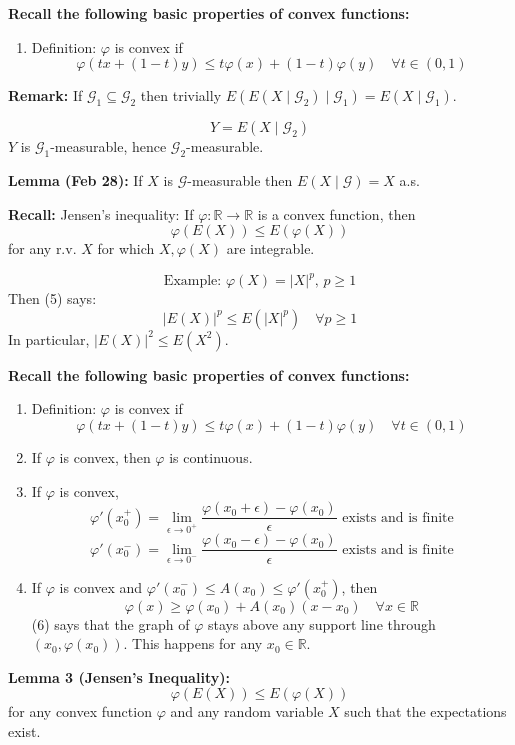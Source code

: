 \textbf{Recall the following basic properties of convex functions:}
\begin{enumerate}
    \item Definition: \(\varphi\) is convex if 
    \[
    \varphi(tx + (1-t)y) \leq t\varphi(x) + (1-t)\varphi(y) \quad \forall t \in (0, 1)
    \]
\end{enumerate}

\textbf{Remark:} If \(\mathcal{G}_1 \subseteq \mathcal{G}_2\) then trivially \( E(E(X \mid \mathcal{G}_2) \mid \mathcal{G}_1) = E(X \mid \mathcal{G}_1) \).

\[
Y = E(X \mid \mathcal{G}_2) 
\]
\( Y \) is \(\mathcal{G}_1\)-measurable, hence \(\mathcal{G}_2\)-measurable.

\textbf{Lemma (Feb 28):} If \(X\) is \(\mathcal{G}\)-measurable then \( E(X \mid \mathcal{G}) = X \) a.s.

\textbf{Recall:} Jensen's inequality: If \( \varphi : \mathbb{R} \rightarrow \mathbb{R} \) is a convex function, then
\[
\varphi(E(X)) \leq E(\varphi(X)) \tag{5}
\]
for any r.v. \(X\) for which \(X, \varphi(X)\) are integrable.

\[
\text{Example: } \varphi(X) = |X|^p, \, p \geq 1 
\]
Then (5) says:
\[
|E(X)|^p \leq E(|X|^p) \quad \forall p \geq 1 
\]
In particular, \( |E(X)|^2 \leq E(X^2) \).

\textbf{Recall the following basic properties of convex functions:}
\begin{enumerate}
    \item Definition: \(\varphi\) is convex if 
    \[
    \varphi(tx + (1-t)y) \leq t\varphi(x) + (1-t)\varphi(y) \quad \forall t \in (0, 1)
    \]

    \item If \(\varphi\) is convex, then \(\varphi\) is continuous.
    \item If \(\varphi\) is convex, 
    \[
    \varphi'(x_0^+) = \lim_{\epsilon \to 0^+} \frac{\varphi(x_0 + \epsilon) - \varphi(x_0)}{\epsilon} \text{ exists and is finite}
    \]
    \[
    \varphi'(x_0^-) = \lim_{\epsilon \to 0^-} \frac{\varphi(x_0 - \epsilon) - \varphi(x_0)}{\epsilon} \text{ exists and is finite}
    \]
    \item If \(\varphi\) is convex and \(\varphi'(x_0^-) \leq A(x_0) \leq \varphi'(x_0^+)\), then
    \[
    \varphi(x) \geq \varphi(x_0) + A(x_0)(x - x_0) \quad \forall x \in \mathbb{R} \tag{6}
    \]
    (6) says that the graph of \(\varphi\) stays above any support line through \((x_0, \varphi(x_0))\). This happens for any \(x_0 \in \mathbb{R}\).
\end{enumerate}

\textbf{Lemma 3 (Jensen's Inequality):}
\begin{equation}
\varphi(E(X)) \leq E(\varphi(X))
\end{equation}
for any convex function \(\varphi\) and any random variable \(X\) such that the expectations exist.

